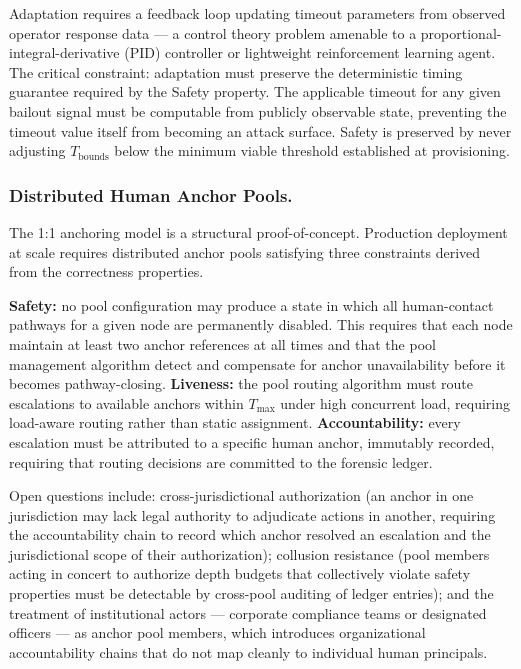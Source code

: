 Adaptation requires a feedback loop updating timeout parameters from observed operator response data — a control theory problem amenable to a proportional-integral-derivative (PID) controller or lightweight reinforcement learning agent. The critical constraint: adaptation must preserve the deterministic timing guarantee required by the Safety property. The applicable timeout for any given bailout signal must be computable from publicly observable state, preventing the timeout value itself from becoming an attack surface. Safety is preserved by never adjusting $T_{\text{bounds}}$ below the minimum viable threshold established at provisioning.

\subsubsection{Distributed Human Anchor Pools.}
\label{sec:future-anchor-pools}

The 1:1 anchoring model is a structural proof-of-concept. Production deployment at scale requires distributed anchor pools satisfying three constraints derived from the correctness properties.

\textbf{Safety:} no pool configuration may produce a state in which all human-contact pathways for a given node are permanently disabled. This requires that each node maintain at least two anchor references at all times and that the pool management algorithm detect and compensate for anchor unavailability before it becomes pathway-closing. \textbf{Liveness:} the pool routing algorithm must route escalations to available anchors within $T_{\max}$ under high concurrent load, requiring load-aware routing rather than static assignment. \textbf{Accountability:} every escalation must be attributed to a specific human anchor, immutably recorded, requiring that routing decisions are committed to the forensic ledger.

Open questions include: cross-jurisdictional authorization (an anchor in one jurisdiction may lack legal authority to adjudicate actions in another, requiring the accountability chain to record which anchor resolved an escalation and the jurisdictional scope of their authorization); collusion resistance (pool members acting in concert to authorize depth budgets that collectively violate safety properties must be detectable by cross-pool auditing of ledger entries); and the treatment of institutional actors — corporate compliance teams or designated officers — as anchor pool members, which introduces organizational accountability chains that do not map cleanly to individual human principals.

